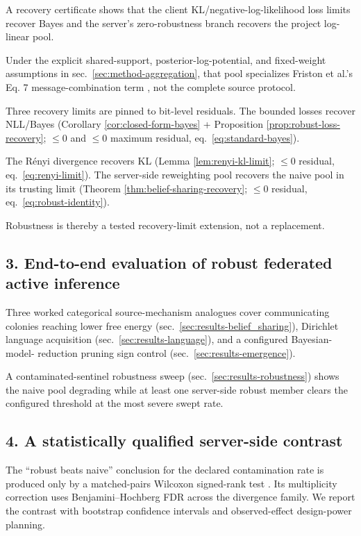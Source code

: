 \documentclass[
  english,
]{article}
\theoremstyle{plain}
\theoremstyle{definition}
\theoremstyle{remark}
\theoremstyle{definition}
\begin{document}
A recovery certificate shows that the client KL/negative-log-likelihood
loss limits recover Bayes and the server's zero-robustness branch
recovers the project log-linear pool.

Under the explicit shared-support, posterior-log-potential, and
fixed-weight assumptions in sec.~\ref{sec:method-aggregation}, that pool
specializes Friston et al.'s Eq. 7 message-combination term
\citep{friston2024federated}, not the complete source protocol.

Three recovery limits are pinned to bit-level residuals. The bounded
losses recover NLL/Bayes (Corollary \ref{cor:closed-form-bayes} +
Proposition \ref{prop:robust-loss-recovery}; \(\le 0\) and \(\le 0\)
maximum residual, eq.~\ref{eq:standard-bayes}).

The Rényi divergence recovers KL (Lemma \ref{lem:renyi-kl-limit};
\(\le 0\) residual, eq.~\ref{eq:renyi-limit}). The server-side
reweighting pool recovers the naive pool in its trusting limit (Theorem
\ref{thm:belief-sharing-recovery}; \(\le 0\) residual,
eq.~\ref{eq:robust-identity}).

Robustness is thereby a tested recovery-limit extension, not a
replacement.

\subsection{3. End-to-end evaluation of robust federated active
inference}\label{end-to-end-evaluation-of-robust-federated-active-inference}

Three worked categorical source-mechanism analogues cover communicating
colonies reaching lower free energy
(sec.~\ref{sec:results-belief_sharing}), Dirichlet language acquisition
(sec.~\ref{sec:results-language}), and a configured Bayesian-model-
reduction pruning sign control \citep{friston2011post}
(sec.~\ref{sec:results-emergence}).

A contaminated-sentinel robustness sweep
(sec.~\ref{sec:results-robustness}) shows the naive pool degrading while
at least one server-side robust member clears the configured threshold
at the most severe swept rate.

\subsection{4. A statistically qualified server-side
contrast}\label{a-statistically-qualified-server-side-contrast}

The ``robust beats naive'' conclusion for the declared contamination
rate is produced only by a matched-pairs Wilcoxon signed-rank test
\citep{wilcoxon1945individual}. Its multiplicity correction uses
Benjamini--Hochberg FDR \citep{benjamini1995controlling} across the
divergence family. We report the contrast with bootstrap confidence
intervals \citep{efron1993bootstrap} and observed-effect design-power
planning.
\end{document}
